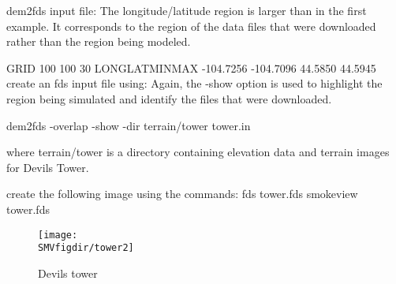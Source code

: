 dem2fds input file:
The longitude/latitude region is larger than in the first example.
It corresponds to the region of the data files that were downloaded rather than the region being modeled.

GRID
 100 100 30
LONGLATMINMAX
 -104.7256 -104.7096 44.5850 44.5945
create an fds input file using:
Again, the -show option is used to highlight the region being simulated and identify the files that were downloaded.

dem2fds -overlap -show -dir terrain/tower tower.in

where terrain/tower is a directory containing elevation data and terrain images for Devils Tower.

create the following image using the commands:
fds tower.fds
smokeview tower.fds

\begin{figure}[bph]
\centerline{
\texttt{[image: \\SMVfigdir/tower2]}}
 \caption[FDS file overview]{Devils tower }
\label{devilstowerB}%
\end{figure}

